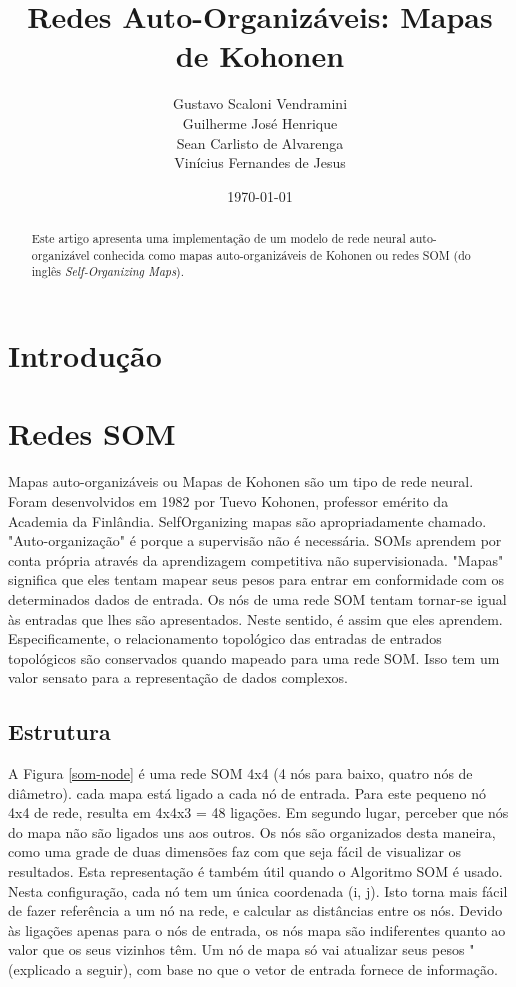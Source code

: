 \documentclass[a4paper]{article}
\title{Redes Auto-Organizáveis: Mapas de Kohonen}
\author{Gustavo Scaloni Vendramini    \\ 
        Guilherme José Henrique       \\
        Sean Carlisto de Alvarenga    \\
        Vinícius Fernandes de Jesus}
\date{\today}
\begin{document}
\maketitle

\begin{abstract}
Este artigo apresenta uma implementação de um modelo de rede neural auto-organizável conhecida como mapas auto-organizáveis de Kohonen ou redes SOM (do inglês \textit{Self-Organizing Maps}).
\end{abstract}

\section{Introdução}\label{introducao}

\section{Redes SOM}\label{som}
Mapas auto-organizáveis ou Mapas de Kohonen são um tipo de rede neural. Foram desenvolvidos em 1982 por Tuevo
Kohonen, professor emérito da Academia da Finlândia. SelfOrganizing mapas são apropriadamente chamado. "Auto-organização" é porque a supervisão não é
necessária. SOMs aprendem por conta própria através da aprendizagem competitiva não supervisionada.
"Mapas" significa que eles tentam mapear seus pesos para entrar em conformidade com os determinados
dados de entrada. Os nós de uma rede SOM tentam tornar-se igual às entradas 
que lhes são apresentados. Neste sentido, é assim que eles aprendem. Especificamente, o relacionamento topológico das entradas de entrados topológicos
são conservados quando mapeado para uma rede SOM. Isso tem um valor sensato
para a representação de dados complexos.

\subsection{Estrutura}

A Figura \ref{som-node} é uma rede SOM 4x4 (4 nós para baixo, quatro nós de diâmetro). 
cada mapa está ligado a cada nó de entrada. Para este pequeno nó 4x4
de rede, resulta em 4x4x3 = 48 ligações. Em segundo lugar, perceber que nós do mapa não são
ligados uns aos outros. Os nós são organizados desta maneira, como uma grade de duas dimensões
faz com que seja fácil de visualizar os resultados. Esta representação é também útil quando o
Algoritmo SOM é usado. Nesta configuração, cada nó tem um única coordenada (i, j).
Isto torna mais fácil de fazer referência a um nó na rede, e
calcular as distâncias entre os nós. Devido às ligações apenas para o
nós de entrada, os nós mapa são indiferentes quanto ao valor que os seus vizinhos têm.
Um nó de mapa só vai atualizar seus pesos "(explicado a seguir), com base no que o vetor de entrada
fornece de informação.
\end{document}
